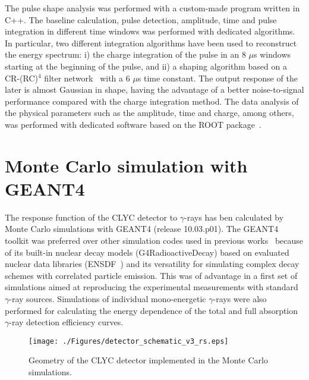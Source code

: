 \documentclass[review,number,sort&compress]{elsarticle}
\begin{document}
The pulse shape analysis was performed with a custom-made program written in C++. The baseline calculation, pulse detection, amplitude, time and pulse integration in different time windows was performed with dedicated algorithms. In particular, two different integration algorithms have been used to reconstruct the energy spectrum: i) the charge integration of the pulse in an 8 $\mu$s windows starting at the beginning of the pulse, and ii) a shaping algorithm based on a CR-(RC)$^{4}$ filter network~\cite{Nak} with a 6 $\mu$s time constant. The output response of the later is almost Gaussian in shape, having the advantage of a better noise-to-signal performance compared with the charge integration method. The data analysis of the physical parameters such as the amplitude, time and charge, among others, was performed with dedicated software based on the ROOT package~\cite{ROOT}. 


\section{Monte Carlo simulation with GEANT4}

The response function of the CLYC detector to $\gamma$-rays has ben calculated by Monte Carlo simulations with GEANT4 (release 10.03.p01). The GEANT4 toolkit was preferred over other simulation codes used in previous works~\cite{Mac,Kim} because of its built-in nuclear decay models (G4RadioactiveDecay) based on evaluated nuclear data libraries (ENSDF~\cite{Bhat}) and its versatility for simulating complex decay schemes with correlated particle emission. This was of advantage in a first set of simulations aimed at reproducing the experimental measurements with standard $\gamma$-ray sources. Simulations of individual mono-energetic $\gamma$-rays were also performed for calculating the energy dependence of the total and full absorption $\gamma$-ray detection efficiency curves.

\begin{figure}[h!]
\centering
\texttt{[image: ./Figures/detector\_schematic\_v3\_rs.eps]}
\caption{Geometry of the CLYC detector implemented in the Monte Carlo simulations.}
\label{g4geom}
\end{figure}
\end{document}
